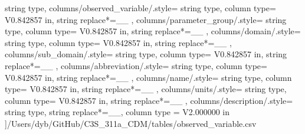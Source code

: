     string type,
    columns/observed_variable/.style={
            string type, 
            column type= V{0.842857 in}, 
            string replace*={_}{\_}
        },
    columns/parameter_group/.style={
            string type, 
            column type= V{0.842857 in}, 
            string replace*={_}{\_}
        },
    columns/domain/.style={
            string type, 
            column type= V{0.842857 in}, 
            string replace*={_}{\_}
        },
    columns/sub_domain/.style={
            string type, 
            column type= V{0.842857 in}, 
            string replace*={_}{\_}
        },
    columns/abbreviation/.style={
            string type, 
            column type= V{0.842857 in}, 
            string replace*={_}{\_}
        },
    columns/name/.style={
            string type, 
            column type= V{0.842857 in}, 
            string replace*={_}{\_}
        },
    columns/units/.style={
            string type, 
            column type= V{0.842857 in}, 
            string replace*={_}{\_}
        },
    columns/description/.style={
            string type, 
            string replace*={_}{\_},
            column type = V{2.000000 in}
        }
    ]{/Users/dyb/GitHub/C3S_311a_CDM/tables/observed_variable.csv}
